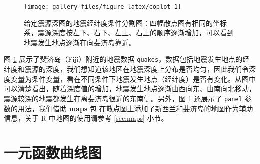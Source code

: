 \documentclass[
  b5paper,
  UTF8,twoside]{book}
\newenvironment{Shaded}{\begin{snugshade}}{\end{snugshade}}
\newcommand{\AttributeTok}[1]{\textcolor[rgb]{0.13,0.29,0.53}{#1}}
\newcommand{\ControlFlowTok}[1]{\textcolor[rgb]{0.13,0.29,0.53}{\textbf{#1}}}
\newcommand{\DecValTok}[1]{\textcolor[rgb]{0.00,0.00,0.81}{#1}}
\newcommand{\FloatTok}[1]{\textcolor[rgb]{0.00,0.00,0.81}{#1}}
\newcommand{\FunctionTok}[1]{\textcolor[rgb]{0.13,0.29,0.53}{\textbf{#1}}}
\newcommand{\NormalTok}[1]{#1}
\newcommand{\OtherTok}[1]{\textcolor[rgb]{0.56,0.35,0.01}{#1}}
\newcommand{\SpecialCharTok}[1]{\textcolor[rgb]{0.81,0.36,0.00}{\textbf{#1}}}
\newcommand{\StringTok}[1]{\textcolor[rgb]{0.31,0.60,0.02}{#1}}
\begin{document}
\begin{figure}

{\centering \texttt{[image: gallery\_files/figure-latex/coplot-1]} 

}

\caption[给定震源深图的地震经纬度条件分割图]{给定震源深图的地震经纬度条件分割图：四幅散点图有相同的坐标系，震源深度按左下、右下、左上、右上的顺序逐渐增加，可以看到地震发生地点逐渐在向斐济岛靠近。}\label{fig:coplot}
\end{figure}

图 \ref{fig:coplot}
展示了斐济岛（Fiji）附近的地震数据 \texttt{quakes}，数据包括地震发生地点的经纬度和震源的深度，我们想知道该地区在地震深度上分布是否均匀，因此我们令深度变量为条件变量，看在不同条件下地震发生地点（经纬度）是否有变化。从图中可以清楚看出，随着深度值的增加，地震发生地点逐渐由西向东、由南向北移动，震源较深的地震都发生在离斐济岛很近的东南侧。另外，图 \ref{fig:coplot}
还展示了 \texttt{panel} 参数的用法，我们借助 \textbf{maps} 包 \citep{maps} 在散点图上添加了新西兰和斐济岛的地图作为辅助信息，关于 R 中地图的使用请参考 \ref{sec:maps} 小节。

\section{一元函数曲线图}\label{sec:curve}





\begin{Shaded}
\end{Shaded}
\end{document}
